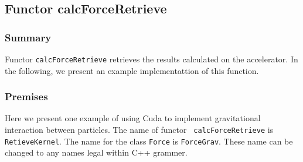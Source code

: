 \subsection{Functor calcForceRetrieve}
\label{sec:example_userdefined_calcForceRetrieve}

\subsubsection{Summary}

Functor  {\tt calcForceRetrieve} retrieves the results calculated on
the accelerator. 
In the following, we present an
example implementattion of this function.

\subsubsection{Premises}


Here we present one example of using Cuda to implement gravitational
interaction between particles.  The name of functor {\tt
  calcForceRetrieve} is {\tt RetieveKernel}. The name for the class
{\tt Force} is  {\tt ForceGrav}.
These name can be changed to any names legal within C++ grammer.



